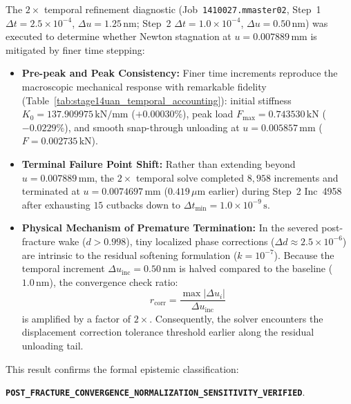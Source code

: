 The $2\times$ temporal refinement diagnostic (Job~\texttt{1410027.mmaster02}, Step~1 $\Delta t = 2.5\times 10^{-4}$, $\Delta u = 1.25\,\mathrm{nm}$; Step~2 $\Delta t = 1.0\times 10^{-4}$, $\Delta u = 0.50\,\mathrm{nm}$) was executed to determine whether Newton stagnation at $u = 0.007889\,\mathrm{mm}$ is mitigated by finer time stepping:
\begin{itemize}
  \item \textbf{Pre-peak and Peak Consistency:} Finer time increments reproduce the macroscopic mechanical response with remarkable fidelity (Table~\ref{tab:stage14uan_temporal_accounting}): initial stiffness $K_0 = 137.909975\,\mathrm{kN/mm}$ ($+0.00030\%$), peak load $F_{\max} = 0.743530\,\mathrm{kN}$ ($-0.0229\%$), and smooth snap-through unloading at $u = 0.005857\,\mathrm{mm}$ ($F = 0.002735\,\mathrm{kN}$).
  \item \textbf{Terminal Failure Point Shift:} Rather than extending beyond $u = 0.007889\,\mathrm{mm}$, the $2\times$ temporal solve completed $8{,}958$ increments and terminated at $u = 0.0074697\,\mathrm{mm}$ ($0.419\,\mu\mathrm{m}$ earlier) during Step~2 Inc~4958 after exhausting $15$ cutbacks down to $\Delta t_{\min} = 1.0\times 10^{-9}\,\mathrm{s}$.
  \item \textbf{Physical Mechanism of Premature Termination:} In the severed post-fracture wake ($d > 0.998$), tiny localized phase corrections ($\Delta d \approx 2.5\times 10^{-6}$) are intrinsic to the residual softening formulation ($k = 10^{-7}$). Because the temporal increment $\Delta u_{\mathrm{inc}} = 0.50\,\mathrm{nm}$ is halved compared to the baseline ($1.0\,\mathrm{nm}$), the convergence check ratio:
  \begin{equation}
    r_{\mathrm{corr}} = \frac{\max |\Delta u_i|}{\Delta u_{\mathrm{inc}}}
  \end{equation}
  is amplified by a factor of $2\times$. Consequently, the solver encounters the displacement correction tolerance threshold earlier along the residual unloading tail.
\end{itemize}

This result confirms the formal epistemic classification:
\begin{center}
{\footnotesize\textbf{\texttt{POST\_FRACTURE\_CONVERGENCE\_NORMALIZATION\_SENSITIVITY\_VERIFIED}}}.
\end{center}

